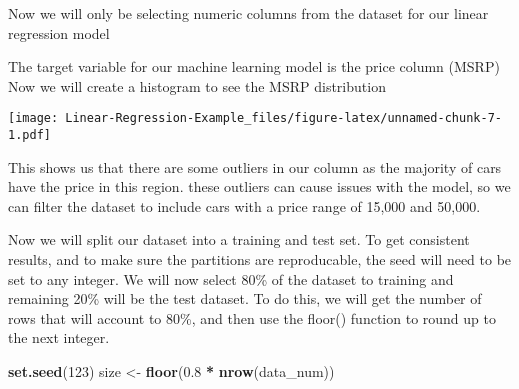 \documentclass[
]{article}
\newenvironment{Shaded}{\begin{snugshade}}{\end{snugshade}}
\newcommand{\DataTypeTok}[1]{\textcolor[rgb]{0.13,0.29,0.53}{#1}}
\newcommand{\DecValTok}[1]{\textcolor[rgb]{0.00,0.00,0.81}{#1}}
\newcommand{\FloatTok}[1]{\textcolor[rgb]{0.00,0.00,0.81}{#1}}
\newcommand{\KeywordTok}[1]{\textcolor[rgb]{0.13,0.29,0.53}{\textbf{#1}}}
\newcommand{\NormalTok}[1]{#1}
\newcommand{\OperatorTok}[1]{\textcolor[rgb]{0.81,0.36,0.00}{\textbf{#1}}}
\newcommand{\StringTok}[1]{\textcolor[rgb]{0.31,0.60,0.02}{#1}}
\begin{document}
Now we will only be selecting numeric columns from the dataset for our
linear regression model

\begin{Shaded}
\end{Shaded}

The target variable for our machine learning model is the price column
(MSRP) Now we will create a histogram to see the MSRP distribution

\begin{Shaded}
\end{Shaded}

\texttt{[image: Linear-Regression-Example\_files/figure-latex/unnamed-chunk-7-1.pdf]}

This shows us that there are some outliers in our column as the majority
of cars have the price in this region. these outliers can cause issues
with the model, so we can filter the dataset to include cars with a
price range of 15,000 and 50,000.

\begin{Shaded}
\end{Shaded}

Now we will split our dataset into a training and test set. To get
consistent results, and to make sure the partitions are reproducable,
the seed will need to be set to any integer. We will now select 80\% of
the dataset to training and remaining 20\% will be the test dataset. To
do this, we will get the number of rows that will account to 80\%, and
then use the floor() function to round up to the next integer.

\begin{Shaded}
\begin{Highlighting}[]
\KeywordTok{set.seed}\NormalTok{(}\DecValTok{123}\NormalTok{)}
\NormalTok{size <-}\StringTok{ }\KeywordTok{floor}\NormalTok{(}\FloatTok{0.8} \OperatorTok{*}\StringTok{ }\KeywordTok{nrow}\NormalTok{(data_num))}
\end{Highlighting}
\end{Shaded}
\end{document}
